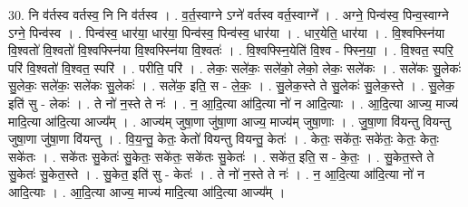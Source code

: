 \documentclass[17pt]{extarticle}
\begin{document}
30. नि व॑र्तस्व वर्तस्व॒ नि नि व॑र्तस्व । . व॒र्त॒स्वाग्ने ऽग्ने॑ वर्तस्व वर्त॒स्वाग्ने᳚ । . अग्ने॒ पिन्व॑स्व॒ पिन्व॒स्वाग्ने ऽग्ने॒ पिन्व॑स्व । . पिन्व॑स्व॒ धार॑या॒ धार॑या॒ पिन्व॑स्व॒ पिन्व॑स्व॒ धार॑या । . धार॒येति॒ धार॑या । . वि॒श्वफ्स्नि॑या वि॒श्वतो॑ वि॒श्वतो॑ वि॒श्वफ्स्नि॑या वि॒श्वफ्स्नि॑या वि॒श्वतः॑ । . वि॒श्वफ्स्नि॒येति॑ वि॒श्व - फ्स्नि॒या॒ । . वि॒श्वत॒ स्परि॒ परि॑ वि॒श्वतो॑ वि॒श्वत॒ स्परि॑ । . परीति॒ परि॑ । . लेकः॒ सले॑कः॒ सले॑को॒ लेको॒ लेकः॒ सले॑कः । . सले॑कः सु॒लेकः॑ सु॒लेकः॒ सले॑कः॒ सले॑कः सु॒लेकः॑ । . सले॑क॒ इति॒ स - ले॒कः॒ । . सु॒लेक॒स्ते ते सु॒लेकः॑ सु॒लेक॒स्ते । . सु॒लेक॒ इति॑ सु - लेकः॑ । . ते नो॑ न॒स्ते ते नः॑ । . न॒ आ॒दि॒त्या आ॑दि॒त्या नो॑ न आदि॒त्याः । . आ॒दि॒त्या आज्य॒ माज्य॑ मादि॒त्या आ॑दि॒त्या आज्य᳚म् । . आज्य॑म् जुषा॒णा जु॑षा॒णा आज्य॒ माज्य॑म् जुषा॒णाः । . जु॒षा॒णा वि॑यन्तु वियन्तु जुषा॒णा जु॑षा॒णा वि॑यन्तु । . वि॒य॒न्तु॒ केतः॒ केतो॑ वियन्तु वियन्तु॒ केतः॑ । . केतः॒ सके॑तः॒ सके॑तः॒ केतः॒ केतः॒ सके॑तः । . सके॑तः सु॒केतः॑ सु॒केतः॒ सके॑तः॒ सके॑तः सु॒केतः॑ । . सके॑त॒ इति॒ स - के॒तः॒ । . सु॒केत॒स्ते ते सु॒केतः॑ सु॒केत॒स्ते । . सु॒केत॒ इति॑ सु - केतः॑ । . ते नो॑ न॒स्ते ते नः॑ । . न॒ आ॒दि॒त्या आ॑दि॒त्या नो॑ न आदि॒त्याः । . आ॒दि॒त्या आज्य॒ माज्य॑ मादि॒त्या आ॑दि॒त्या आज्य᳚म् । \newline
\end{document}
